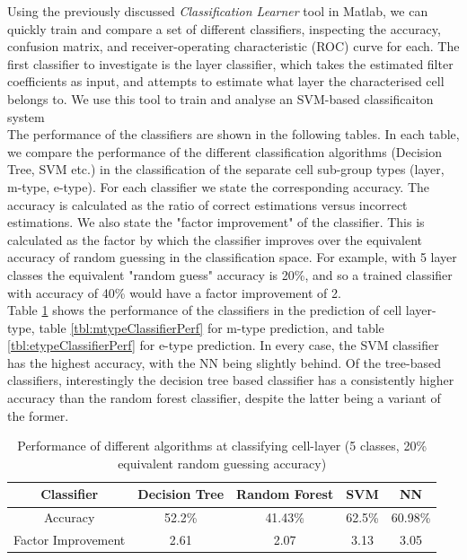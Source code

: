 \documentclass[letterpaper, 10 pt, conference]{ieeeconf}  %
\begin{document}
\par

Using the previously discussed \emph{Classification Learner} tool in Matlab, we can quickly train and compare a set of different classifiers, inspecting the accuracy, confusion matrix, and receiver-operating characteristic (ROC) curve for each. The first classifier to investigate is the layer classifier, which takes the estimated filter coefficients as input, and attempts to estimate what layer the characterised cell belongs to. We use this tool to train and analyse an SVM-based classificaiton system\\
The performance of the classifiers are shown in the following tables. In each table, we compare the performance of the different classification algorithms (Decision Tree, SVM etc.) in the classification of the separate cell sub-group types (layer, m-type, e-type). For each classifier we state the corresponding accuracy. The accuracy is calculated as the ratio of correct estimations versus incorrect estimations. We also state the "factor improvement" of the classifier. This is calculated as the factor by which the classifier improves over the equivalent accuracy of random guessing in the classification space. For example, with 5 layer classes the equivalent "random guess" accuracy is 20\%, and so a trained classifier with accuracy of 40\% would have a factor improvement of 2. \\

Table \ref{tbl:layerClassifierPerf} shows the performance of the classifiers in the prediction of cell layer-type, table \ref{tbl:mtypeClassifierPerf} for m-type prediction, and table \ref{tbl:etypeClassifierPerf} for e-type prediction. In every case, the SVM classifier has the highest accuracy, with the NN being slightly behind. Of the tree-based classifiers, interestingly the decision tree based classifier has a consistently higher accuracy than the random forest classifier, despite the latter being a variant of the former. 


\begin{table}[h]
    \centering
    \begin{tabular}{|c||c|c|c|c|}
        \hline
        Classifier & Decision Tree & Random Forest & SVM & NN\\
        \hline\hline
        Accuracy & 52.2\% & 41.43\% & 62.5\% & 60.98\%\\
        \hline
        Factor Improvement & 2.61 & 2.07 & 3.13 & 3.05 \\
        \hline
    \end{tabular}
    \caption{Performance of different algorithms at classifying cell-layer (5 classes, 20\% equivalent random guessing accuracy)}
    \label{tbl:layerClassifierPerf}
\end{table}
\end{document}
